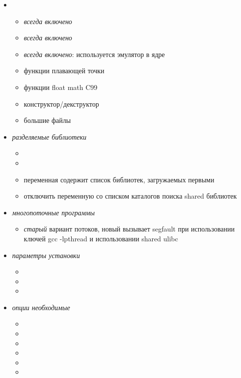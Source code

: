\begin{itemize}[nosep]
\item
\begin{itemize}[nosep]
\item {} \emph{всегда включено}
\item {} \emph{всегда включено}
\item {} \emph{всегда включено}: используется эмулятор в
ядре
\item {} функции плавающей точки
\item {} функции float math C99
\item {} конструктор/декструктор
\item {} большие файлы
\end{itemize}
\item \emph{разделяемые  библиотеки}
\begin{itemize}[nosep]
  \item {}
  \item {} 
  \item {} переменная 
  содержит список библиотек, загружаемых первыми
  \item {} отключить
  переменную  со списком каталогов поиска shared
  библиотек
\end{itemize}
\item \emph{многопоточные  программы }
\begin{itemize}[nosep]
  \item {} \emph{старый} вариант потоков, новый вызывает
  segfault при использовании ключей gcc -lpthread и использовании shared ulibc
\end{itemize}
\item \emph{параметры установки}
\begin{itemize}[nosep]
\item {}
\item {}
\item {}
\end{itemize}
\item \emph{опции необходимые }
\begin{itemize}[nosep]
\item {}
\item {}
\item {}
\item {}
\item {}
\item {}
\end{itemize}
\end{itemize}

